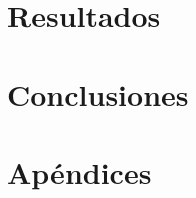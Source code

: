\documentclass[12pt,titlepage,twoside,openright]{book}
\begin{document}
\chapter{Resultados}
\label{cap:resultados}

\chapter{Conclusiones}
\label{cap:conclusiones}

\backmatter







\appendix
\chapter{Apéndices}
\label{ap:apendices}
\end{document}
